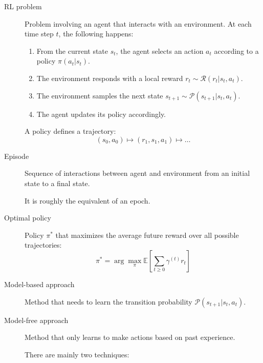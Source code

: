 \begin{description}
    \item[RL problem] 
        Problem involving an agent that interacts with an environment.
        At each time step $t$, the following happens:
        \begin{enumerate}
            \item From the current state $s_t$, the agent selects an action $a_t$ according to a policy $\pi(a_t | s_t)$.
            \item The environment responds with a local reward $r_t \sim \mathcal{R}(r_t | s_t, a_t)$.
            \item The environment samples the next state $s_{t+1} \sim \mathcal{P}(s_{t+1} | s_t, a_t)$.
            \item The agent updates its policy accordingly.
        \end{enumerate}

        \begin{remark}
            A policy defines a trajectory:
            \[ (s_0, a_0) \mapsto (r_1, s_1, a_1) \mapsto \dots \]
        \end{remark}

    \item[Episode] 
        Sequence of interactions between agent and environment from an initial state to a final state.

        \begin{remark}
            It is roughly the equivalent of an epoch.
        \end{remark}

    \item[Optimal policy] 
        Policy $\pi^*$ that maximizes the average future reward over all possible trajectories:
        \[ \pi^* = \arg\max_\pi \mathbb{E}\left[ \sum_{t \geq 0} \gamma^{(t)} r_t \right] \]

    \item[Model-based approach] 
        Method that needs to learn the transition probability $\mathcal{P}(s_{t+1} | s_t, a_t)$.

    \item[Model-free approach] 
        Method that only learns to make actions based on past experience.

        There are mainly two techniques:
\end{description}



